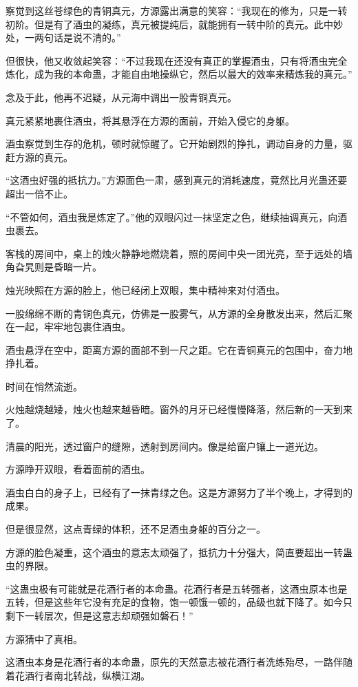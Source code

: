 \begin{this_body}
察觉到这丝苍绿色的青铜真元，方源露出满意的笑容：“我现在的修为，只是一转初阶。但是有了酒虫的凝练，真元被提纯后，就能拥有一转中阶的真元。此中妙处，一两句话是说不清的。”

但很快，他又收敛起笑容：“不过我现在还没有真正的掌握酒虫，只有将酒虫完全炼化，成为我的本命蛊，才能自由地操纵它，然后以最大的效率来精炼我的真元。”

念及于此，他再不迟疑，从元海中调出一股青铜真元。

真元紧紧地裹住酒虫，将其悬浮在方源的面前，开始入侵它的身躯。

酒虫察觉到生存的危机，顿时就惊醒了。它开始剧烈的挣扎，调动自身的力量，驱赶方源的真元。

“这酒虫好强的抵抗力。”方源面色一肃，感到真元的消耗速度，竟然比月光蛊还要超出一倍不止。

“不管如何，酒虫我是炼定了。”他的双眼闪过一抹坚定之色，继续抽调真元，向酒虫裹去。

客栈的房间中，桌上的烛火静静地燃烧着，照的房间中央一团光亮，至于远处的墙角旮旯则是昏暗一片。

烛光映照在方源的脸上，他已经闭上双眼，集中精神来对付酒虫。

一股绵绵不断的青铜色真元，仿佛是一股雾气，从方源的全身散发出来，然后汇聚在一起，牢牢地包裹住酒虫。

酒虫悬浮在空中，距离方源的面部不到一尺之距。它在青铜真元的包围中，奋力地挣扎着。

时间在悄然流逝。

火烛越烧越矮，烛火也越来越昏暗。窗外的月牙已经慢慢降落，然后新的一天到来了。

清晨的阳光，透过窗户的缝隙，透射到房间内。像是给窗户镶上一道光边。

方源睁开双眼，看着面前的酒虫。

酒虫白白的身子上，已经有了一抹青绿之色。这是方源努力了半个晚上，才得到的成果。

但是很显然，这点青绿的体积，还不足酒虫身躯的百分之一。

方源的脸色凝重，这个酒虫的意志太顽强了，抵抗力十分强大，简直要超出一转蛊虫的界限。

“这蛊虫极有可能就是花酒行者的本命蛊。花酒行者是五转强者，这酒虫原本也是五转，但是这些年它没有充足的食物，饱一顿饿一顿的，品级也就下降了。如今只剩下一转层次，但是这意志却顽强如磐石！”

方源猜中了真相。

这酒虫本身是花酒行者的本命蛊，原先的天然意志被花酒行者洗练殆尽，一路伴随着花酒行者南北转战，纵横江湖。


\end{this_body}
